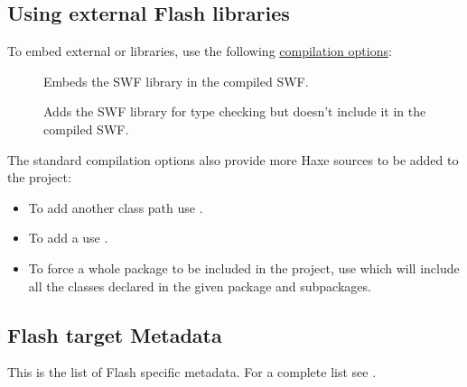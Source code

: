 \subsection{Using external Flash libraries}
\label{target-flash-external-libraries}

To embed external  or  libraries, use the following \href{http://haxe.org/documentation/introduction/compiler-usage.html}{compilation options}:

\begin{description}
	\item[] Embeds the SWF library in the compiled SWF.
	\item[] Adds the SWF library for type checking but doesn't include it in the compiled SWF.
\end{description}

The standard compilation options also provide more Haxe sources to be added to the project:

\begin{itemize}
	\item To add another class path use .
	\item To add a  use .
	\item To force a whole package to be included in the project, use  which will include all the classes declared in the given package and subpackages. 
\end{itemize}

\subsection{Flash target Metadata}
\label{target-flash-metadata}

This is the list of Flash specific metadata. For a complete list see .

